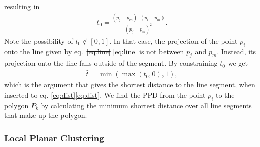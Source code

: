 \documentclass[5p]{elsarticle}
\providecommand{\DIFdeltex}[1]{{\protect\color{red}\sout{#1}}}                      %
\providecommand{\DIFaddbegin}{} %
\providecommand{\DIFaddend}{} %
\providecommand{\DIFdelbegin}{} %
\providecommand{\DIFdelend}{} %
\providecommand{\DIFdel}[1]{\texorpdfstring{\DIFdeltex{#1}}{}} %
\begin{document}
resulting in 
\begin{align}
	t_0 = \frac{\left( p_j - p_m \right) \cdot \left( p_i - p_m \right)}{\left( p_j - p_m \right)^2} .
\end{align}
Note the possibility of $t_0 \notin \left[ 0, 1 \right]$. 
In that case, the projection of the point $p_i$ onto the line given by eq.~\DIFdelbegin \DIFdel{\ref{eq:line} }\DIFdelend \DIFaddbegin \eqref{eq:line} \DIFaddend is not between $p_j$ and $p_m$. 
Instead, its projection onto the line falls outside of the segment.
By constraining $t_0$ we get 
\begin{align}
\label{eq:minmax}
	\hat t = \min \left( \max \left( t_0, 0\right) , 1 \right) ,
\end{align}
which is the argument that gives the shortest distance to the line segment, when inserted to eq. \DIFdelbegin \DIFdel{\ref{eq:dist}}\DIFdelend \DIFaddbegin \eqref{eq:dist}\DIFaddend .
We find the PPD from the point $p_i$ to the polygon $P_k$ by calculating the minimum shortest distance over all line segments that make up the polygon.  

\subsubsection{Local Planar Clustering}
\end{document}
